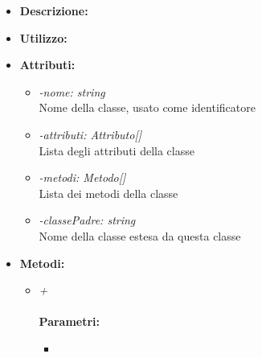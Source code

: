 \begin{itemize}
	\item \textbf{Descrizione:}\\
	
	\item \textbf{Utilizzo:}\\
	
	\item \textbf{Attributi:}
		\begin{itemize}
			\item \emph{-nome: string}\\
			Nome della classe, usato come identificatore
			\item \emph{-attributi: Attributo[]}\\
			Lista degli attributi della classe
			\item \emph{-metodi: Metodo[]}\\
			Lista dei metodi della classe
			\item \emph{-classePadre: string}\\
			Nome della classe estesa da questa classe
		\end{itemize}
	\item \textbf{Metodi:}
		\begin{itemize}
			\item \emph{+}\\
    		\\
    		\textbf{Parametri:}
    		\begin{itemize}
    			\item \emph{}\\
    			
    		\end{itemize}
    		
    		
    	\end{itemize}
\end{itemize}
